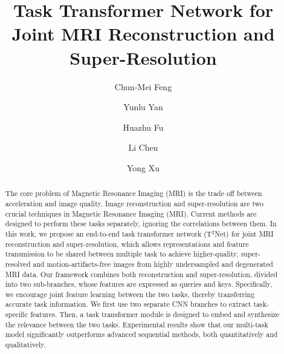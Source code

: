 \documentclass[runningheads]{llncs}
\begin{document}
\title{Task Transformer Network for Joint MRI Reconstruction and Super-Resolution}  
\author{Chun-Mei Feng
\and
Yunlu Yan
\and
Huazhu Fu
\and
Li Chen
\and
Yong Xu }

\maketitle              \begin{abstract}
The core problem of Magnetic Resonance Imaging (MRI) is the trade off between acceleration and image quality. Image reconstruction and super-resolution are two crucial techniques in Magnetic Resonance Imaging (MRI). Current methods are designed to perform these tasks separately, ignoring the correlations between them. In this work, we propose an end-to-end task transformer network (T$^2$Net) for joint MRI reconstruction and super-resolution, which allows representations and feature transmission to be shared between multiple task to achieve higher-quality, super-resolved and motion-artifacts-free images from highly undersampled and degenerated MRI data. Our framework combines both reconstruction and super-resolution, divided into two sub-branches, whose features are expressed as queries and keys. Specifically, we encourage joint feature learning between the two tasks, thereby transferring accurate task information. We first use two separate CNN branches to extract task-specific features. Then, a task transformer module is designed to embed and synthesize the relevance between the two tasks. Experimental results show that our multi-task model significantly outperforms advanced sequential methods, both quantitatively and qualitatively. 




\end{abstract}
\end{document}
